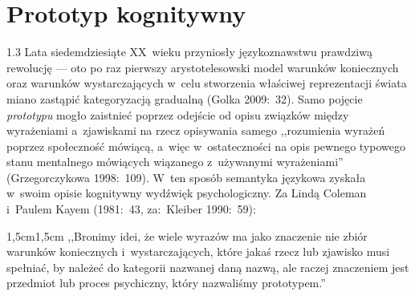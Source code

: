 \documentclass[11pt,a4paper,twoside]{report}
\begin{document}
\chapter{Prototyp kognitywny}
\begin{spacing}{1.3}
Lata siedemdziesiąte XX~wieku przyniosły językoznawstwu prawdziwą rewolucję --- oto po raz pierwszy arystotelesowski model warunków koniecznych oraz warunków wystarczających w~celu stworzenia właściwej reprezentacji świata miano zastąpić kategoryzacją gradualną (Golka 2009:~32). Samo pojęcie \emph{prototypu} mogło zaistnieć poprzez odejście od opisu związków między wyrażeniami a~zjawiskami na rzecz opisywania samego ,,rozumienia wyrażeń poprzez społeczność mówiącą, a~więc w~ostateczności na opis pewnego typowego stanu mentalnego mówiących wiązanego z~używanymi wyrażeniami'' (Grzegorczykowa 1998:~109). W~ten sposób semantyka językowa zyskała w~swoim opisie kognitywny wydźwięk psychologiczny. Za Lindą Coleman i~Paulem Kayem (1981:~43, za:~Kleiber 1990:~59):
\end{spacing}
\begin{adjustwidth}{1,5cm}{1,5cm}
\small{
,,Bronimy idei, że wiele wyrazów ma jako znaczenie nie zbiór warunków koniecznych i~wystarczających, które jakaś rzecz lub zjawisko musi spełniać, by należeć do kategorii nazwanej daną nazwą, ale raczej znaczeniem jest przedmiot lub proces psychiczny, który nazwaliśmy prototypem.''
}
\end{adjustwidth}
\end{document}
